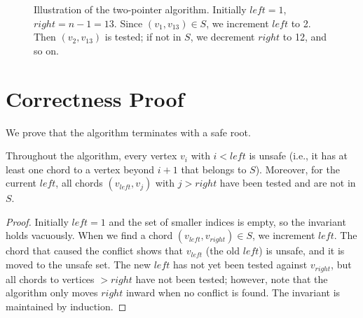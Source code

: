 \begin{figure}[htbp]
    \centering
    \caption{Illustration of the two-pointer algorithm. Initially $left=1$, $right=n-1=13$. 
    Since $(v_1, v_{13}) \in S$, we increment $left$ to 2. 
    Then $(v_2, v_{13})$ is tested; if not in $S$, we decrement $right$ to 12, and so on.}
    \label{fig:two_pointer}
\end{figure}

\section{Correctness Proof}
\label{sec:two_pointer_correctness}

We prove that the algorithm terminates with a safe root.

\begin{lemma}[Invariant]
    \label{lem:two_pointer_invariant}
    Throughout the algorithm, every vertex $v_i$ with $i < left$ is unsafe (i.e., it has at least one chord to a vertex beyond $i+1$ that belongs to $S$). 
    Moreover, for the current $left$, all chords $(v_{left}, v_j)$ with $j > right$ have been tested and are not in $S$.
\end{lemma}

\begin{proof}
    Initially $left = 1$ and the set of smaller indices is empty, so the invariant holds vacuously. 
    When we find a chord $(v_{left}, v_{right}) \in S$, we increment $left$. 
    The chord that caused the conflict shows that $v_{left}$ (the old $left$) is unsafe, and it is moved to the unsafe set. 
    The new $left$ has not yet been tested against $v_{right}$, but all chords to vertices $> right$ have not been tested; however, note that the algorithm only moves $right$ inward when no conflict is found. 
    The invariant is maintained by induction.
\end{proof}

